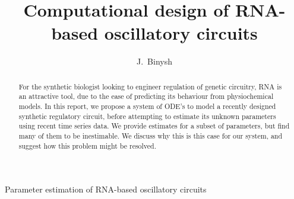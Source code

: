\documentclass[10pt,journal]{./IEEE_latex_class/IEEEtran}
\begin{document}
%
\title{Computational design of RNA-based oscillatory circuits}

\author{J.~Binysh
        \\ }

%
{Parameter estimation of RNA-based oscillatory circuits}

\maketitle

\thispagestyle{empty}

\newcommand{\MYheader}{\smash{\scriptsize

\hfil\parbox[t][\height][t]{\textwidth}{\centering {\normalsize
Place conference title here}}\hfil\hbox{}}}
\makeatletter

\if@twoside
  \def\ps@headings{%
      \let\@oddfoot\@empty\let\@evenfoot\@empty
      \def\@evenhead{\small\thepage\hfil\leftmark\strut\vadjust{\vskip .1ex\hrule}}%
      \def\@oddhead{\small\rightmark\hfil\thepage\strut\vadjust{\vskip .1ex\hrule}}%
      \let\@mkboth\markboth
    \def\chaptermark##1{%
      \markboth{\scshape%
        \ifnum \c@secnumdepth >\m@ne
            \@chapapp\ \thechapter. \ %
        \fi
        ##1}{}}%
    \def\sectionmark##1{%
      \markright{\scshape%
        \ifnum \c@secnumdepth >\z@
          \thesection. \ %
        \fi
        ##1}}}
\else
  \def\ps@headings{%
    \let\@oddfoot\@empty
    \def\@oddhead{{\slshape\rightmark}\hfil\thepage\ of\ \pageref{LastPage} \strut\vadjust{\vskip .1ex\hrule}}%
    \let\@mkboth\markboth
    \def\chaptermark##1{%
      \markright{\scshape%
        \ifnum \c@secnumdepth >\m@ne
            \@chapapp\ \thechapter. \ %
        \fi
        ##1}}}
\fi
\makeatother

\makeatother

\pagestyle{headings}

\begin{abstract}
For the synthetic biologist looking to engineer regulation of genetic circuitry, RNA is an attractive tool, due to the ease of predicting its behaviour from physiochemical models. In this report, we propose a system of ODE's to model a recently designed synthetic regulatory circuit, before attempting to estimate its unknown parameters using recent time series data. We provide estimates for a subset of parameters, but find many of them to be inestimable. We discuss why this is this case for our system, and suggest how this problem might be resolved.
\end{abstract}
\end{document}
